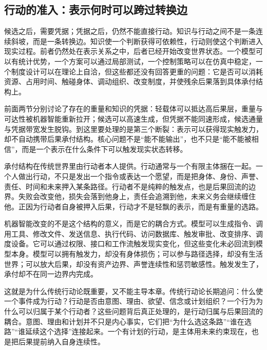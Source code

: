 \subsection{行动的准入：表示何时可以跨过转换边}

候选之后，需要凭据；凭据之后，仍然不能直接行动。知识与行动之间不是一条连续斜坡，而是一条转换边。知识使一个判断获得可依赖性，行动则使这个判断进入现实过程。前者仍然处在表示关系之中，后者已经开始改变世界状态。一个模型可以有统计优势，一个方案可以通过局部测试，一个控制策略可以在仿真中稳定，一个制度设计可以在理论上自洽，但这些都还没有回答更重的问题：它是否可以消耗资源、占用时间、触碰身体、调动组织、改变制度，并使残余后果落到具体承付结构上。


前面两节分别讨论了存在的重量和知识的凭据：轻载体可以抵达高后果层，重量与可达性被机器智能重新拉开；候选可以高速生成，但凭据不能同速形成，候选通量与凭据带宽发生脱钩。到这里要处理的是第三个断裂：表示可以获得现实触发力，却不自动携带后果承付结构。核心问题不是“能不能输出”，也不只是“能不能被相信”，而是一个表示在什么条件下可以触发现实状态转移。


承付结构在传统世界里由行动者本人提供。行动通常与一个有限主体捆在一起。一个人做出行动，不只是发出一个指令或表达一个愿望，而是把身体、身份、声誉、责任、时间和未来押入某条路径。行动者不是纯粹的触发点，也是后果回流的边界。失败会改变他，损失会落到他身上，责任会追溯到他，未来义务会继续缠住他。正因为行动者自身被押入后果，行动才不是轻飘的表示，而是有重量的选路\cite{arendt1958human}。

机器智能改变的不是这个结构的意义，而是它的耦合方式。模型可以生成指令、调用工具、修改文件、发送信息、执行代码、访问数据库、触发审批、改变排序、调度设备。它可以通过权限、接口和工作流触发现实变化，但这些变化未必回流到模型本身。模型可以拥有触发力，却没有身体损伤；可以参与路径选择，却没有生活世界；可以放大后果，却没有资产边界、声誉连续性和惩罚敏感性。触发发生了，承付却不在同一边界内完成。


这就是为什么传统行动论既重要，又不能主导本章。传统行动论长期追问：什么使一个事件成为行动？行动是否由意图、理由、欲望、信念或计划组织\cite{davidson1963actions}？一个行为为什么可以归属于某个行动者？这些问题背后真正处理的，是行动归属与后果回流的耦合。意图、理由和计划并不只是内心事实，它们把“为什么选这条路”“谁在选路”“谁延续这个选择”连接起来。一个有计划的行动，是主体用未来约束现在，也是把后果提前纳入自身连续性\cite{anscombe1957intention}。

